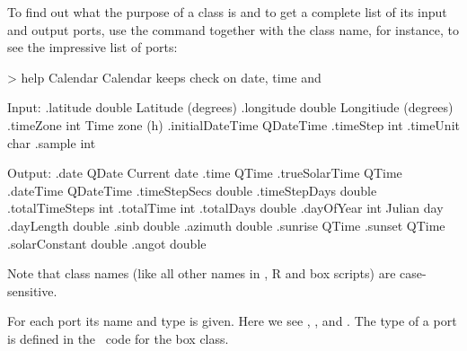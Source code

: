To find out what the purpose of a class is and to get a complete list of its
input and output ports, use the  command together with the class
name, for instance, to see the impressive list of  ports:
\begin{usdialog}
> help Calendar
Calendar keeps check on date, time and %

Input:
.latitude        double    Latitude (degrees)
.longitude       double    Longitiude (degrees)
.timeZone        int       Time zone (h)
.initialDateTime QDateTime %
.timeStep        int       %
.timeUnit        char      %
.sample          int       %

Output:
.date            QDate     Current date
.time            QTime     %
.trueSolarTime   QTime     %
.dateTime        QDateTime %
.timeStepSecs    double    %
.timeStepDays    double    %
.totalTimeSteps  int       %
.totalTime       int       %
.totalDays       double    %
.dayOfYear       int       Julian day
.dayLength       double    %
.sinb            double    %
.azimuth         double    %
.sunrise         QTime     %
.sunset          QTime     %
.solarConstant   double    %
.angot           double    %
\end{usdialog}
Note that class names (like all other names in \CPP, R and box scripts) are case-sensitive.

For each port its name and type is given. Here we see , ,  and . The type of a port is defined in the \CPP\ code for the box class.